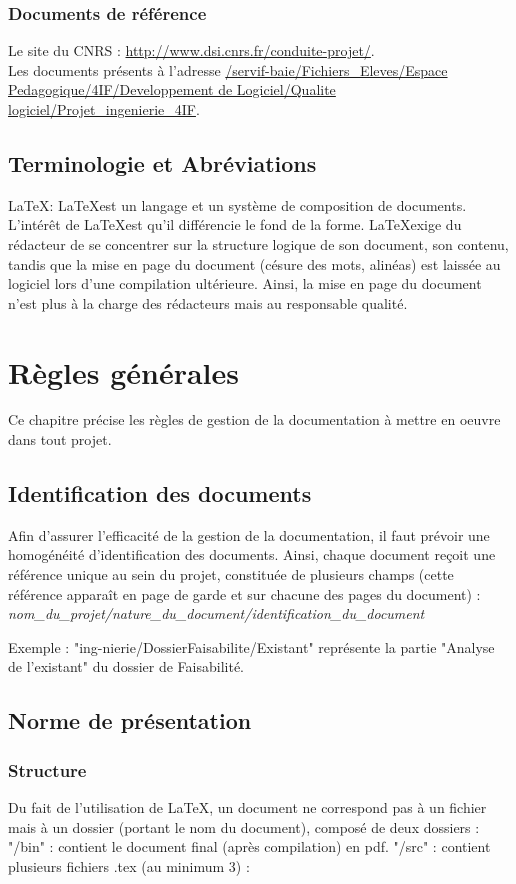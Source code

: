     \subsubsection{Documents de référence}
      Le site du CNRS : \url{http://www.dsi.cnrs.fr/conduite-projet/}.\\
      Les documents présents à l'adresse \url{/servif-baie/Fichiers_Eleves/Espace Pedagogique/4IF/Developpement de Logiciel/Qualite logiciel/Projet_ingenierie_4IF}.
  \subsection{Terminologie et Abréviations}
  \LaTeX : \LaTeX est un langage et un système de composition de documents. L'intérêt de \LaTeX est qu'il différencie le fond de la forme.
            \LaTeX exige du rédacteur de se concentrer sur la structure logique de son document, son contenu, tandis que la mise en page du document (césure des mots, alinéas) est laissée au logiciel lors d'une compilation ultérieure.
            Ainsi, la mise en page du document n'est plus à la charge des rédacteurs mais au responsable qualité.
             
\section{Règles générales}
Ce chapitre précise les règles de gestion de la documentation à mettre en oeuvre dans tout projet.
  \subsection{Identification des documents}
  Afin d’assurer l’efficacité de la gestion de la documentation, il faut prévoir une homogénéité d’identification des documents.
Ainsi, chaque document reçoit une référence unique au sein du projet, constituée de plusieurs champs (cette référence apparaît en page de garde et sur chacune des pages du document) :
\textit{nom\_du\_projet/nature\_du\_document/identification\_du\_document}

\par Exemple : "ing-nierie/DossierFaisabilite/Existant" représente la partie "Analyse de l'existant" du dossier de Faisabilité.

  \subsection{Norme de présentation}
    \subsubsection{Structure}
      Du fait de l'utilisation de \LaTeX, un document ne correspond pas à un fichier mais à un dossier (portant le nom du document), composé de deux dossiers :
       "/bin" : contient le document final (après compilation) en pdf.
       "/src" : contient plusieurs fichiers .tex (au minimum 3) :
